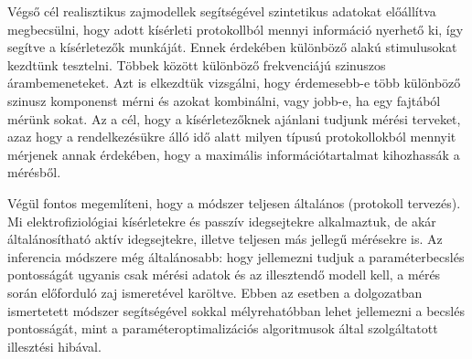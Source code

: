 Végső cél realisztikus zajmodellek segítségével szintetikus adatokat előállítva megbecsülni, hogy adott kísérleti protokollból mennyi információ nyerhető ki, így segítve a kísérletezők munkáját. Ennek érdekében különböző alakú stimulusokat kezdtünk tesztelni. Többek között különböző frekvenciájú szinuszos árambemeneteket. Azt is elkezdtük vizsgálni, hogy érdemesebb-e több különböző szinusz komponenst mérni és azokat kombinálni, vagy jobb-e, ha egy fajtából mérünk sokat. Az a cél, hogy a kísérletezőknek ajánlani tudjunk mérési terveket, azaz hogy a rendelkezésükre álló idő alatt milyen típusú protokollokból mennyit mérjenek annak érdekében, hogy a maximális információtartalmat kihozhassák a mérésből.

Végül fontos megemlíteni, hogy a módszer teljesen általános (protokoll tervezés). Mi elektrofiziológiai kísérletekre és passzív idegsejtekre alkalmaztuk, de akár általánosítható aktív idegsejtekre, illetve teljesen más jellegű mérésekre is. Az inferencia módszere még általánosabb: hogy jellemezni tudjuk a paraméterbecslés pontosságát ugyanis csak mérési adatok és az illesztendő modell kell, a mérés során előforduló zaj ismeretével karöltve. Ebben az esetben a dolgozatban ismertetett módszer segítségével sokkal mélyrehatóbban lehet jellemezni a becslés pontosságát, mint a paraméteroptimalizációs algoritmusok által szolgáltatott illesztési hibával.